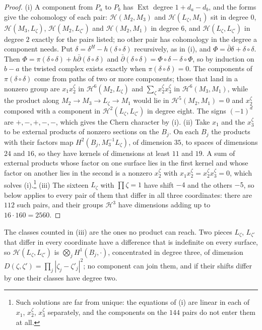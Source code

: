 \documentclass[11pt,reqno]{amsart}
\theoremstyle{plain}
\theoremstyle{definition}
\theoremstyle{remark}
\newcommand{\cH}{\mathcal{H}}
\DeclareMathOperator{\Ext}{Ext}
\begin{document}
\begin{proof}
(i) A component from $P_{a}$ to $P_{b}$ has $\Ext$ degree $1+d_{a}-d_{b}$, and
the forms give the cohomology of each pair: $\cH(M_{2},M_{3})$ and
$\cH(L_{\zeta},M_{1})$ sit in degree $0$, $\cH(M_{3},L_{\zeta})$,
$\cH(M_{2},L_{\zeta'})$ and $\cH(M_{2},M_{1})$ in degree $6$, and
$\cH(L_{\zeta},L_{\zeta'})$ in degree $2$ exactly for the pairs listed; no
other pair has cohomology in the degree a component needs. Put
$\delta=\delta^{H}-h(\delta\circ\delta)$ recursively, as in
(i), and $\Phi=\bar\partial\delta+\delta\circ\delta$.
Then $\Phi=\pi(\delta\circ\delta)+h\bar\partial(\delta\circ\delta)$ and
$\bar\partial(\delta\circ\delta)=\Phi\circ\delta-\delta\circ\Phi$, so by
induction on $b-a$ the twisted complex exists exactly when
$\pi(\delta\circ\delta)=0$. The components of $\pi(\delta\circ\delta)$ come
from paths of two or more components; those that land in a nonzero group
are $x_{1}x_{2}^{\zeta}$ in $\cH^{6}(M_{2},L_{\zeta})$ and
$\sum_{\zeta}x_{2}^{\zeta}x_{3}^{\zeta}$ in $\cH^{6}(M_{3},M_{1})$, while the
product along $M_{2}\to M_{3}\to L_{\zeta}\to M_{1}$ would lie in
$\cH^{5}(M_{2},M_{1})=0$ and $x_{2}^{\zeta}$ composed with a component in
$\cH^{2}(L_{\zeta},L_{\zeta'})$ in degree eight. The signs
$(-1)^{d}$ are $+,-,+,-,-$, which gives the Chern character by
(i).
(ii) Take $x_{1}$ and the $x_{3}^{\zeta}$ to be external products of
nonzero sections on the $B_{j}$. On each $B_{j}$ the products with their
factors map $H^{2}(B_{j},M_{3}^{-1}L_{\zeta})$, of dimension $35$, to spaces
of dimensions $24$ and $16$, so they have kernels of dimensions at least $11$
and $19$. A sum of external products whose factor on one surface lies in the
first kernel and whose factor on another lies in the second is a nonzero
$x_{2}^{\zeta}$ with $x_{1}x_{2}^{\zeta}=x_{2}^{\zeta}x_{3}^{\zeta}=0$, which
solves (i).\footnote{Such solutions are far from unique: the equations of
(i) are linear in each of $x_{1}$, $x_{2}^{\zeta}$, $x_{3}^{\zeta}$
separately, and the components on the $144$ pairs do not enter them at
all.}
(iii) The sixteen $L_{\zeta}$ with $\prod\zeta=1$ have shift $-4$ and the
others $-5$, so  below applies to every pair of them
that differ in all three coordinates: there are $112$ such pairs, and their
groups $\cH^{3}$ have dimensions adding up to $16\cdot160=2560$.
\end{proof}

The classes counted in (iii) are the ones no product can reach. Two pieces
$L_{\zeta}$, $L_{\zeta'}$ that differ in every coordinate have a difference
that is indefinite on every surface, so $\cH(L_{\zeta},L_{\zeta'})$ is
$\bigotimes_{j}H^{1}(B_{j},\cdot)$, concentrated in degree three, of
dimension $D(\zeta,\zeta')=\prod_{j}|\zeta_{j}-\zeta'_{j}|^{2}$; no component
can join them, and if their shifts differ by one their classes have degree
two.
\end{document}
